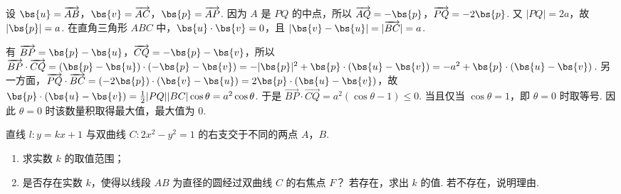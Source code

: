 \begin{solution}
设 \(\bs{u}=\overrightarrow{AB}\)，\(\bs{v}=\overrightarrow{AC}\)，\(\bs{p}=\overrightarrow{AP}\). 因为 \(A\) 是 \(PQ\) 的中点，所以 \(\overrightarrow{AQ}=-\bs{p}\)，\(\overrightarrow{PQ}=-2\bs{p}\). 又 \(|PQ|=2a\)，故 \(|\bs{p}|=a\). 在直角三角形 \(ABC\) 中，\(\bs{u}\cdot\bs{v}=0\)，且 \(|\bs{v}-\bs{u}|=|\overrightarrow{BC}|=a\).

有 \(\overrightarrow{BP}=\bs{p}-\bs{u}\)，\(\overrightarrow{CQ}=-\bs{p}-\bs{v}\)，所以 \(\overrightarrow{BP}\cdot\overrightarrow{CQ}=(\bs{p}-\bs{u})\cdot(-\bs{p}-\bs{v})=-|\bs{p}|^2+\bs{p}\cdot(\bs{u}-\bs{v})=-a^2+\bs{p}\cdot(\bs{u}-\bs{v})\). 另一方面，\(\overrightarrow{PQ}\cdot\overrightarrow{BC}=(-2\bs{p})\cdot(\bs{v}-\bs{u})=2\bs{p}\cdot(\bs{u}-\bs{v})\)，故 \(\bs{p}\cdot(\bs{u}-\bs{v})=\frac{1}{2}|PQ||BC|\cos\theta=a^2\cos\theta\). 于是 \(\overrightarrow{BP}\cdot\overrightarrow{CQ}=a^2(\cos\theta-1)\leqslant0\). 当且仅当 \(\cos\theta=1\)，即 \(\theta=0\) 时取等号. 因此 \(\theta=0\) 时该数量积取得最大值，最大值为 \(0\).
\end{solution}

\begin{problem}
直线 \(l: y=kx+1\) 与双曲线 \(C: 2x^2-y^2=1\) 的右支交于不同的两点 \(A\)，\(B\).

\begin{enumerate}
\item 求实数 \(k\) 的取值范围；

\item 是否存在实数 \(k\)，使得以线段 \(AB\) 为直径的圆经过双曲线 \(C\) 的右焦点 \(F\)？ 若存在，求出 \(k\) 的值. 若不存在，说明理由.
\end{enumerate}
\end{problem}

